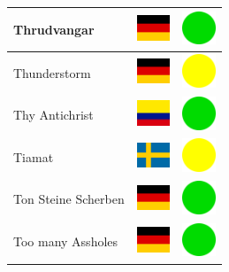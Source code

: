 \documentclass[12pt, a4paper, twoside]{report}
\begin{document}
\begin{center}
\begin{longtable}{|p{5cm}|p{2cm}|p{2cm}|}
Thrudvangar & \includegraphics[width=1cm]{4x3/de} & \includegraphics[width=1cm]{likes/y} \\ \hline
Thunderstorm & \includegraphics[width=1cm]{4x3/de} & \includegraphics[width=1cm]{likes/m} \\ \hline
Thy Antichrist & \includegraphics[width=1cm]{4x3/co} & \includegraphics[width=1cm]{likes/y} \\ \hline
Tiamat & \includegraphics[width=1cm]{4x3/se} & \includegraphics[width=1cm]{likes/m} \\ \hline
Ton Steine Scherben & \includegraphics[width=1cm]{4x3/de} & \includegraphics[width=1cm]{likes/y} \\ \hline
Too many Assholes & \includegraphics[width=1cm]{4x3/de} & \includegraphics[width=1cm]{likes/y} \\ \hline

\end{longtable}
\end{center}
\end{document}
